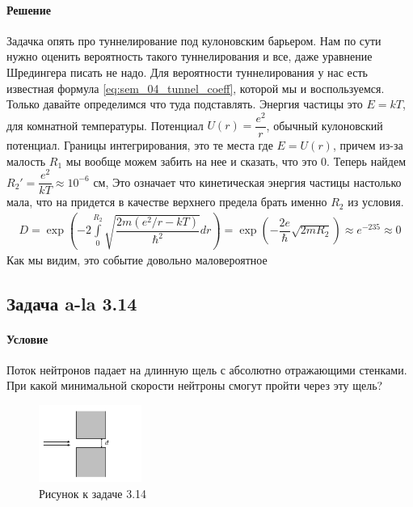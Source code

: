 \documentclass[12pt]{article}
\begin{document}
\paragraph{Решение}
Задачка опять про туннелирование под кулоновским барьером. Нам по сути нужно оценить вероятность такого туннелирования и все, даже уравнение Шредингера писать не надо. Для вероятности туннелирования у нас есть известная формула \ref{eq:sem_04_tunnel_coeff}, которой мы и воспользуемся. Только давайте определимся что туда подставлять. Энергия частицы это $E = kT$, для комнатной температуры. Потенциал $U(r) = \dfrac{e^2}{r}$, обычный кулоновский потенциал. Границы интегрирования, это те места где $E=U(r)$, причем из-за малость $R_1$ мы вообще можем забить на нее и сказать, что это 0. Теперь найдем $R_2' = \dfrac{e^2}{kT} \approx 10^{-6} \text{ см}$, Это означает что кинетическая энергия частицы настолько мала, что на придется в качестве верхнего предела брать именно $R_2$ из условия. 
\begin{gather*}
     D  = \exp{\left( -2\int\limits_{0}^{R_2}\sqrt{\dfrac{2m(e^2/r-kT)}{\hbar^2}} dr \right)} = \exp{\left( -\dfrac{2e}{\hbar}\sqrt{2mR_2} \right)} \approx e^{-235} \approx 0
\end{gather*}
Как мы видим, это событие довольно маловероятное
\subsection{Задача a-la 3.14}
\label{task_3.14}
\paragraph{Условие}
Поток нейтронов падает на длинную щель с абсолютно отражающими стенками. При какой минимальной скорости нейтроны смогут пройти через эту щель?
\begin{figure}[h]
    \centering
    \includegraphics[width=0.3\textwidth,height=\textheight,keepaspectratio]{Seminar_04/pics/pic_07.pdf}
    \caption{Рисунок к задаче 3.14}
\end{figure}
\end{document}
